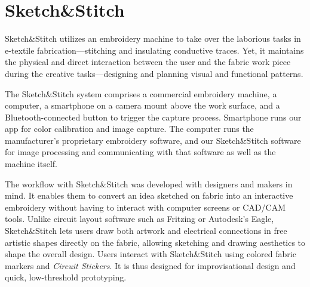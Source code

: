 \documentclass[header.tex]{subfiles}
\begin{document}
\section{Sketch\&Stitch}
Sketch\&Stitch utilizes an embroidery machine to take over the laborious tasks in e-textile fabrication---stitching and insulating conductive traces. Yet, it maintains the physical and direct interaction between the user and the fabric work piece during the creative tasks---designing and planning visual and functional patterns. 

The Sketch\&Stitch system comprises a commercial embroidery machine, a computer, a smartphone on a camera mount above the work surface, and a Bluetooth-connected button to trigger the capture process. Smartphone runs our app for color calibration and image capture. The computer runs the manufacturer's proprietary embroidery software, and our Sketch\&Stitch software for image processing and communicating with that software as well as the machine itself.

The workflow with Sketch\&Stitch was developed with designers and makers in mind. %
It enables them to convert an idea sketched on fabric into an interactive embroidery without having to interact with computer screens or CAD/CAM tools. Unlike circuit layout software such as Fritzing or Autodesk's Eagle, Sketch\&Stitch lets users draw both artwork and electrical connections in free artistic shapes directly on the fabric, allowing sketching and drawing aesthetics to shape the overall design. 
Users interact with Sketch\&Stitch using colored fabric markers and \textit{Circuit Stickers}. It is thus designed for improvisational design and quick, low-threshold prototyping.
 

\end{document}
